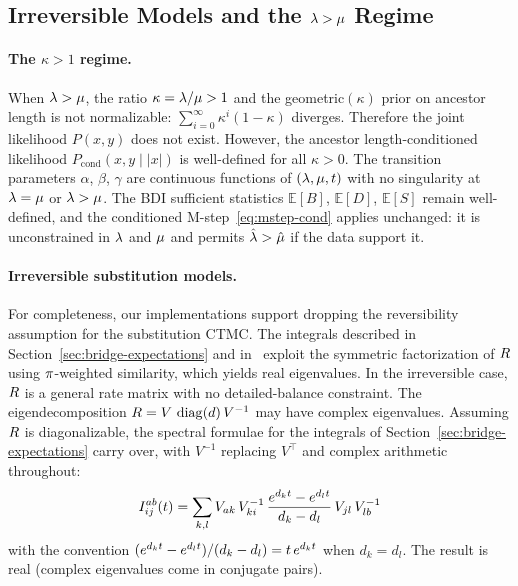 
\subsection{\texorpdfstring{Irreversible Models and the $\lambda > \mu$ Regime}{Irreversible Models and the lambda > mu Regime}}
\label{sec:irreversible}

\paragraph{The $\kappa > 1$ regime.}
When $\lambda > \mu$, the ratio $\kappa = \lambda/\mu > 1$
and the geometric$(\kappa)$ prior on ancestor length is not
normalizable: $\sum_{i=0}^\infty \kappa^i(1-\kappa)$ diverges.
Therefore the joint likelihood $P(x,y)$ does not exist.
However, the ancestor length-conditioned likelihood
$P_{\mathrm{cond}}(x,y \mid |x|)$
is well-defined for all $\kappa > 0$.
The transition parameters $\alpha$, $\beta$, $\gamma$ are
continuous functions of $(\lambda,\mu,t)$
with no singularity at $\lambda = \mu$ or $\lambda > \mu$.
The BDI sufficient statistics $\mathbb{E}[B]$, $\mathbb{E}[D]$,
$\mathbb{E}[S]$ remain well-defined, and the conditioned
M-step~\eqref{eq:mstep-cond} applies unchanged:
it is unconstrained in $\lambda$ and $\mu$ and permits
$\hat{\lambda} > \hat{\mu}$ if the data support it.

\paragraph{Irreversible substitution models.}
For completeness, our implementations support dropping the
reversibility assumption for the substitution CTMC.
The integrals described in Section~\ref{sec:bridge-expectations} and in~\cite{HolmesRubin2002}
exploit the symmetric factorization of $R$
using $\pi$-weighted similarity, which yields real eigenvalues.
In the irreversible case, $R$ is a general rate matrix
with no detailed-balance constraint.
The eigendecomposition $R = V\,\operatorname{diag}(d)\,V^{-1}$
may have complex eigenvalues.
Assuming $R$ is diagonalizable, the spectral formulae for the integrals of Section~\ref{sec:bridge-expectations} carry over,
with $V^{-1}$ replacing $V^\top$ and complex arithmetic throughout:
\[
I^{ab}_{ij}(t) =
\sum_{k,l} V_{ak}\,V^{-1}_{ki}\,
\frac{e^{d_kt} - e^{d_lt}}{d_k - d_l}\,
V_{jl}\,V^{-1}_{lb}
\]
with the convention $(e^{d_kt} - e^{d_lt})/(d_k - d_l) = t\,e^{d_kt}$
when $d_k = d_l$.
The result is real (complex eigenvalues come in conjugate pairs).

